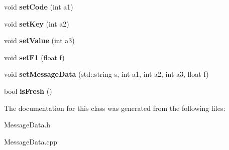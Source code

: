 \begin{DoxyCompactItemize}
\item 
void {\bfseries set\+Code} (int a1)\hypertarget{classMessageData_a8639583a844208ccae9568bb68d1e547}{}\label{classMessageData_a8639583a844208ccae9568bb68d1e547}

\item 
void {\bfseries set\+Key} (int a2)\hypertarget{classMessageData_a54a0ddfb44fba671ba243914b037e231}{}\label{classMessageData_a54a0ddfb44fba671ba243914b037e231}

\item 
void {\bfseries set\+Value} (int a3)\hypertarget{classMessageData_a24e273f0a4443505ccf6222405cfb567}{}\label{classMessageData_a24e273f0a4443505ccf6222405cfb567}

\item 
void {\bfseries set\+F1} (float f)\hypertarget{classMessageData_a94dce06ace95a93c075dbaf253e559fe}{}\label{classMessageData_a94dce06ace95a93c075dbaf253e559fe}

\item 
void {\bfseries set\+Message\+Data} (std\+::string s, int a1, int a2, int a3, float f)\hypertarget{classMessageData_a9eb7741e4216075b0e03c554d83e35ae}{}\label{classMessageData_a9eb7741e4216075b0e03c554d83e35ae}

\item 
bool {\bfseries is\+Fresh} ()\hypertarget{classMessageData_a169f4e7ec5a0eb896cfccd8186b5fe8d}{}\label{classMessageData_a169f4e7ec5a0eb896cfccd8186b5fe8d}

\end{DoxyCompactItemize}


The documentation for this class was generated from the following files\+:\begin{DoxyCompactItemize}
\item 
Message\+Data.\+h\item 
Message\+Data.\+cpp\end{DoxyCompactItemize}

